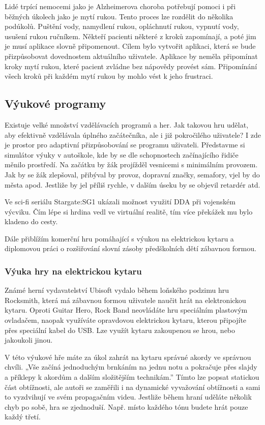 Lidé trpící nemocemi jako je Alzheimerova choroba potřebují pomoci i při běžných úkolech jako je mytí rukou. Tento proces lze rozdělit do několika podúkolů. Puštění vody, namydlení rukou, opláchnutí rukou, vypnutí vody, usušení rukou ručníkem. Někteří pacienti některé z kroků zapomínají, a poté jim je musí aplikace slovně připomenout. Cílem bylo vytvořit aplikaci, která se bude přizpůsobovat dovednostem aktuálního uživatele. Aplikace by neměla připomínat kroky mytí rukou, které pacient zvládne bez nápovědy provést sám. Připomínání všech kroků při každém mytí rukou by mohlo vést k jeho frustraci. \cite{10Dementia} 

\subsection{Výukové programy}

Existuje velké množství vzdělávacích programů a her. Jak takovou hru udělat, aby efektivně vzdělávala úplného začátečníka, ale i již pokročilého uživatele? I zde je prostor pro adaptivní přizpůsobování se programu uživateli. Představme si simulátor výuky v autoškole, kde by se dle schopnostech začínajícího řidiče měnilo prostředí. Na začátku by žák projížděl vesnicemi s minimálním provozem. Jak by se žák zlepšoval, přibýval by provoz, dopravní značky, semafory, vjel by do města apod. Jestliže by jel příliš rychle, v dalším úseku by se objevil retardér atd.

Ve sci-fi seriálu Stargate:SG1 ukázali možnost využití DDA při vojenském výcviku. Čím lépe si hrdina vedl ve virtuální realitě, tím více překážek mu bylo kladeno do cesty. \cite{11Stargate} 

Dále přiblížím komerční hru pomáhající s výukou na elektrickou kytaru a diplomovou práci o rozšiřování slovní zásoby předškolních dětí zábavnou formou.

\subsubsection{Výuka hry na elektrickou kytaru}

Známé herní vydavatelství Ubisoft vydalo během loňského podzimu hru Rocksmith, která má zábavnou formou uživatele naučit hrát na elektronickou kytaru. Oproti Guitar Hero, Rock Band neovládáte hru speciálním plastovým ovladačem, naopak využíváte opravdovou elektrickou kytaru, kterou připojíte přes speciální kabel do USB. Lze využít kytaru zakoupenou se hrou, nebo jakoukoli jinou.

V této výukové hře máte za úkol zahrát na kytaru správné akordy ve správnou chvíli. „Vše začíná jednoduchým brnkáním na jednu notu a pokračuje přes slajdy a příklepy k akordům a dalším složitějším technikám.”\cite{12RocksmithRev} Tímto lze popsat statickou část obtížnosti, ale autoři se zaměřili i na dynamické vyvažování obtížnosti a sami to vyzdvihují ve svém propagačním videu.\cite{13RocksmithVid} Jestliže během hraní uděláte několik chyb po sobě, hra se zjednoduší. Např. místo každého tónu budete hrát pouze každý třetí.

